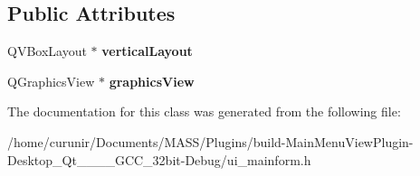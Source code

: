 \subsection*{Public Attributes}
\begin{DoxyCompactItemize}
\item 
Q\+V\+Box\+Layout $\ast$ {\bfseries vertical\+Layout}\hypertarget{class_ui___main_form_a5e14da3ca81145c355d9031c9abbace3}{}\label{class_ui___main_form_a5e14da3ca81145c355d9031c9abbace3}

\item 
Q\+Graphics\+View $\ast$ {\bfseries graphics\+View}\hypertarget{class_ui___main_form_a7d730a97a28524c1d1d6fac3dc96ace2}{}\label{class_ui___main_form_a7d730a97a28524c1d1d6fac3dc96ace2}

\end{DoxyCompactItemize}


The documentation for this class was generated from the following file\+:\begin{DoxyCompactItemize}
\item 
/home/curunir/\+Documents/\+M\+A\+S\+S/\+Plugins/build-\/\+Main\+Menu\+View\+Plugin-\/\+Desktop\+\_\+\+Qt\+\_\+\_\+\_\+\_\+\+G\+C\+C\+\_\+32bit-\/\+Debug/ui\+\_\+mainform.\+h\end{DoxyCompactItemize}
